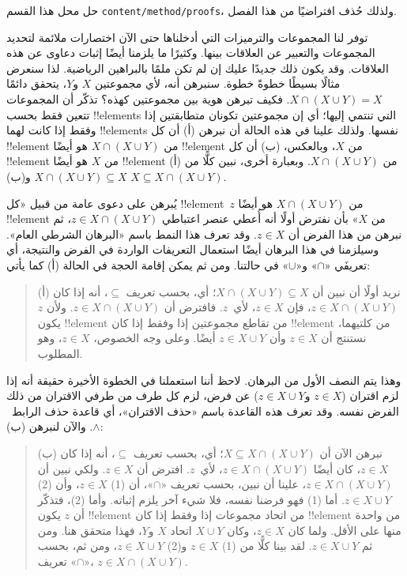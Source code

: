 \documentclass[../../../include/open-logic-section]{subfiles}
\begin{document}

\begin{editorial}
حل محل هذا القسم \verb|content/method/proofs|، ولذلك حُذف افتراضيًا
من هذا الفصل.
\end{editorial}

\begin{explain}
توفر لنا المجموعات والترميزات التي أدخلناها حتى الآن اختصارات ملائمة
لتحديد المجموعات والتعبير عن العلاقات بينها. وكثيرًا ما يلزمنا أيضًا
إثبات دعاوى عن هذه العلاقات. وقد يكون ذلك جديدًا عليك إن لم تكن ملمًا
بالبراهين الرياضية. لذا سنعرض مثالًا بسيطًا خطوةً خطوة. سنبرهن أنه، لأي
مجموعتين $X$ و$Y$، يتحقق دائمًا $X \cap (X \cup Y) = X$. فكيف تبرهن
هوية بين مجموعتين كهذه؟ تذكّر أن المجموعات تتعين فقط بحسب !!{element}s
التي تنتمي إليها؛ أي إن مجموعتين تكونان متطابقتين إذا وفقط إذا كانت
لهما !!{element}s نفسها. ولذلك علينا في هذه الحالة أن نبرهن (أ) أن كل
!!{element} من $X \cap (X \cup Y)$ هو أيضًا !!{element} من $X$،
وبالعكس، (ب) أن كل !!{element} من $X$ هو أيضًا !!{element} من
$X \cap (X \cup Y)$. وبعبارة أخرى، نبين كلًّا من (أ)
$X \cap (X \cup Y) \subseteq X$ و(ب) $X \subseteq X \cap (X \cup Y)$.

يُبرهن على دعوى عامة من قبيل «كل !!{element}~$z$ من $X \cap (X
\cup Y)$ هو أيضًا !!{element} من $X$» بأن نفترض أولًا أنه أُعطي
عنصر اعتباطي $z \in X \cap (X \cup Y)$، ثم نبرهن من هذا الفرض أن
$z \in X$. وقد تعرف هذا النمط باسم «البرهان الشرطي العام». وسيلزمنا
في هذا البرهان أيضًا استعمال التعريفات الواردة في الفرض والنتيجة،
أي تعريفَي «$\cap$» و«$\cup$» في حالتنا. ومن ثم يمكن إقامة الحجة في
الحالة (أ) كما يأتي:

\begin{quote}
(أ) نريد أولًا أن نبين أن $X \cap (X \cup Y) \subseteq X$؛ أي، بحسب
تعريف $\subseteq$، أنه إذا كان $z \in X \cap (X \cup Y)$، فإن
$z \in X$، لأي~$z$. فافترض أن $z \in X \cap (X \cup Y)$. ولأن
$z$ يكون !!{element} من تقاطع مجموعتين إذا وفقط إذا كان !!{element}
من كلتيهما، نستنتج أن $z \in X$ وأن $z \in X \cup Y$ أيضًا. وعلى
وجه الخصوص، $z \in X$، وهو المطلوب.
\end{quote}

وهذا يتم النصف الأول من البرهان. لاحظ أننا استعملنا في الخطوة الأخيرة
حقيقة أنه إذا لزم اقتران ($z \in X$ و$z \in X \cup Y$) عن فرض، لزم
كل طرف من طرفي الاقتران من ذلك الفرض نفسه. وقد تعرف هذه القاعدة باسم
«حذف الاقتران»، أي قاعدة حذف الرابط~$\land$. والآن لنبرهن (ب):

\begin{quote}
(ب) نبرهن الآن أن $X \subseteq X \cap (X \cup Y)$؛ أي، بحسب تعريف
$\subseteq$، أنه إذا كان $z \in X$، كان أيضًا $z \in X \cap
(X \cup Y)$، لأي~$z$. افترض أن $z \in X$. ولكي نبين أن $z \in X
\cap (X \cup Y)$، علينا أن نبين، بحسب تعريف «$\cap$»، أن (1)
$z \in X$، وأن (2) $z \in X \cup Y$. أما (1) فهو فرضنا نفسه، فلا
شيء آخر يلزم إثباته. وأما (2)، فتذكّر أن $z$ يكون !!{element} من اتحاد
مجموعات إذا وفقط إذا كان !!{element} من واحدة منها على الأقل. ولما كان
$z \in X$، وكان $X \cup Y$ اتحاد $X$ و$Y$، فهذا متحقق هنا. ومن ثم
$z \in X \cup Y$. لقد بينا كلًّا من (1) $z \in X$ و(2)
$z \in X \cup Y$، ومن ثم، بحسب تعريف «$\cap$»،
$z \in X \cap (X \cup Y)$.
\end{quote}


\end{explain}
\end{document}
